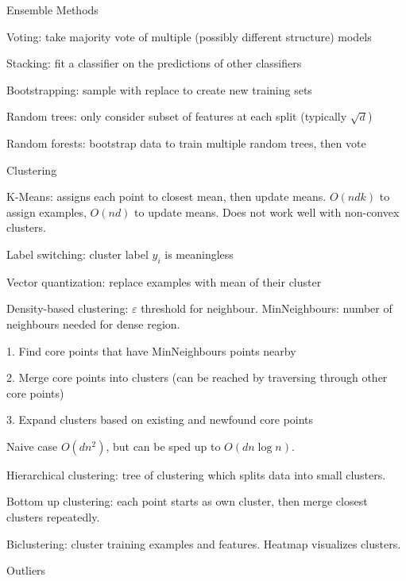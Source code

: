 \documentclass[10pt]{article}
\makeatletter
\renewcommand{\section}{\@startsection{section}{1}{0ex}{-1ex}{0.7ex}
                        {\normalfont\normalsize\bfseries}}
\makeatother
\begin{document}
\begin{multicols*}{3}
\section{Ensemble Methods}

Voting: take majority vote of multiple (possibly different structure) models

Stacking: fit a classifier on the predictions of other classifiers

Bootstrapping: sample with replace to create new training sets 

Random trees: only consider subset of features at each split (typically $\sqrt{d}$)

Random forests: bootstrap data to train multiple random trees, then vote

\section{Clustering}

K-Means: assigns each point to closest mean, then update means. $O(ndk)$ to assign examples, $O(nd)$ to update means. Does not work well with non-convex clusters.

Label switching: cluster label $\hat y_i$ is meaningless

Vector quantization: replace examples with mean of their cluster

Density-based clustering: $\varepsilon$ threshold for neighbour. MinNeighbours: number of neighbours needed for dense region.

1. Find core points that have MinNeighbours points nearby

2. Merge core points into clusters (can be reached by traversing through other core points)

3. Expand clusters based on existing and newfound core points

Naive case $O(dn^2)$, but can be sped up to $O(dn\log n)$. 

Hierarchical clustering: tree of clustering which splits data into small clusters. 

Bottom up clustering: each point starts as own cluster, then merge closest clusters repeatedly. 

Biclustering: cluster training examples and features. Heatmap visualizes clusters.

\section{Outliers}


\end{multicols*}
\end{document}
